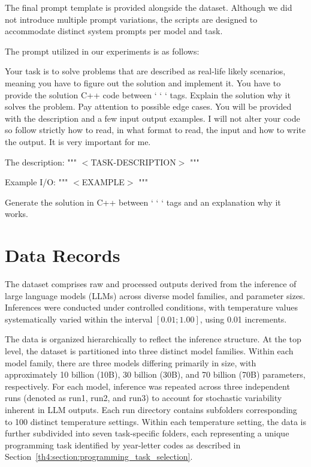 The final prompt template is provided alongside the dataset.
Although we did not introduce multiple prompt variations, the scripts are designed to accommodate distinct system prompts per model and task.

The prompt utilized in our experiments is as follows:\\
\begin{minipage}{0.99\textwidth}
	\label{th4:our_prompt}
	
	\begin{ieeepromptbox}
		Your task is to solve problems that are described as real-life likely scenarios, meaning you have to figure out the solution and implement it.
		You have to provide the solution C++ code between ` ` ` tags.
		Explain the solution why it solves the problem.
		Pay attention to possible edge cases.
		You will be provided with the description and a few input output examples.
		I will not alter your code so follow strictly how to read, in what format to read, the input and how to write the output.
		It is very important for me.
		
		The description:
		"""
		$<$TASK-DESCRIPTION$>$
		"""
		
		Example I/O:
		"""
		$<$EXAMPLE$>$
		"""
		
		Generate the solution in C++ between ` ` ` tags and an explanation why it works.
	\end{ieeepromptbox}
	
\end{minipage}


\section{Data Records}
\label{th4:section:data_records}

The dataset\cite{result_data} comprises raw and processed outputs derived from the inference of large language models (LLMs) across diverse model families, and parameter sizes.
Inferences were conducted under controlled conditions, with temperature values systematically varied within the interval $[0.01;1.00]$, using 0.01 increments.

The data is organized hierarchically to reflect the inference structure.
At the top level, the dataset is partitioned into three distinct model families.
Within each model family, there are three models differing primarily in size, with approximately 10 billion (10B), 30 billion (30B), and 70 billion (70B) parameters, respectively.
For each model, inference was repeated across three independent runs (denoted as run1, run2, and run3) to account for stochastic variability inherent in LLM outputs.
Each run directory contains subfolders corresponding to 100 distinct temperature settings.
Within each temperature setting, the data is further subdivided into seven task-specific folders, each representing a unique programming task identified by year-letter codes as described in Section~\ref{th4:section:programming_task_selection}.

